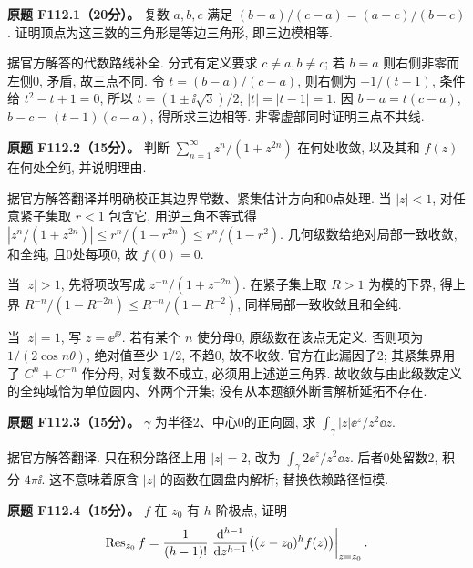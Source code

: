 \begin{exercise}\label{ass:f112-1}
\textbf{原题 F112.1（20分）。} 复数 $a,b,c$ 满足 $(b-a)/(c-a)=(a-c)/(b-c)$. 证明顶点为这三数的三角形是等边三角形, 即三边模相等.
\end{exercise}
\begin{solution}
据官方解答的代数路线补全. 分式有定义要求 $c\ne a,b\ne c$; 若 $b=a$ 则右侧非零而左侧0, 矛盾, 故三点不同. 令 $t=(b-a)/(c-a)$, 则右侧为 $-1/(t-1)$, 条件给 $t^2-t+1=0$, 所以 $t=(1\pm\ii\sqrt3)/2$, $|t|=|t-1|=1$. 因 $b-a=t(c-a)$, $b-c=(t-1)(c-a)$, 得所求三边相等. 非零虚部同时证明三点不共线.
\end{solution}
\begin{exercise}\label{ass:f112-2}
\textbf{原题 F112.2（15分）。} 判断 $\sum_{n=1}^{\infty}z^n/(1+z^{2n})$ 在何处收敛, 以及其和 $f(z)$ 在何处全纯, 并说明理由.
\end{exercise}
\begin{solution}
据官方解答翻译并明确校正其边界常数、紧集估计方向和0点处理. 当 $|z|<1$, 对任意紧子集取 $r<1$ 包含它, 用逆三角不等式得 $|z^n/(1+z^{2n})|\le r^n/(1-r^{2n})\le r^n/(1-r^2)$. 几何级数给绝对局部一致收敛, 和全纯, 且0处每项0, 故 $f(0)=0$.

当 $|z|>1$, 先将项改写成 $z^{-n}/(1+z^{-2n})$. 在紧子集上取 $R>1$ 为模的下界, 得上界 $R^{-n}/(1-R^{-2n})\le R^{-n}/(1-R^{-2})$, 同样局部一致收敛且和全纯.

当 $|z|=1$, 写 $z=\ee^{\ii\theta}$. 若有某个 $n$ 使分母0, 原级数在该点无定义. 否则项为 $1/(2\cos n\theta)$, 绝对值至少 $1/2$, 不趋0, 故不收敛. 官方在此漏因子2; 其紧集界用了 $C^n+C^{-n}$ 作分母, 对复数不成立, 必须用上述逆三角界. 故收敛与由此级数定义的全纯域恰为单位圆内、外两个开集; 没有从本题额外断言解析延拓不存在.
\end{solution}
\begin{exercise}\label{ass:f112-3}
\textbf{原题 F112.3（15分）。} $\gamma$ 为半径2、中心0的正向圆, 求 $\int_\gamma |z|\ee^z/z^2\dd z$.
\end{exercise}
\begin{solution}据官方解答翻译. 只在积分路径上用 $|z|=2$, 改为 $\int_\gamma2\ee^z/z^2\dd z$. 后者0处留数2, 积分 $4\pi\ii$. 这不意味着原含 $|z|$ 的函数在圆盘内解析; 替换依赖路径恒模.\end{solution}
\begin{exercise}\label{ass:f112-4}
\textbf{原题 F112.4（15分）。} $f$ 在 $z_0$ 有 $h$ 阶极点, 证明
\[
\operatorname{Res}_{z_0}f=\frac1{(h-1)!}\left.\frac{\mathrm d^{h-1}}{\mathrm dz^{h-1}}\big((z-z_0)^hf(z)\big)\right|_{z=z_0}.
\]
\end{exercise}
